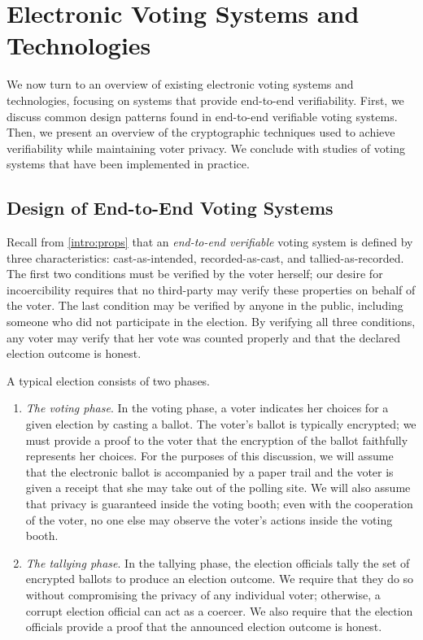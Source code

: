 \chapter{Electronic Voting Systems and Technologies} \label{evote}

We now turn to an overview of existing electronic voting systems and technologies, focusing on systems that provide end-to-end verifiability. First, we discuss common design patterns found in end-to-end verifiable voting systems. Then, we present an overview of the cryptographic techniques used to achieve verifiability while maintaining voter privacy. We conclude with studies of voting systems that have been implemented in practice.

\section{Design of End-to-End Voting Systems} \label{evote:design}

Recall from \ref{intro:props} that an \emph{end-to-end verifiable} voting system is defined by three characteristics: cast-as-intended, recorded-as-cast, and tallied-as-recorded. The first two conditions must be verified by the voter herself; our desire for incoercibility requires that no third-party may verify these properties on behalf of the voter. The last condition may be verified by anyone in the public, including someone who did not participate in the election. By verifying all three conditions, any voter may verify that her vote was counted properly and that the declared election outcome is honest.

A typical election consists of two phases.
\begin{enumerate}
\item \emph{The voting phase}. In the voting phase, a voter indicates her choices for a given election by casting a ballot. The voter's ballot is typically encrypted; we must provide a proof to the voter that the encryption of the ballot faithfully represents her choices. For the purposes of this discussion, we will assume that the electronic ballot is accompanied by a paper trail and the voter is given a receipt that she may take out of the polling site. We will also assume that privacy is guaranteed inside the voting booth; even with the cooperation of the voter, no one else may observe the voter's actions inside the voting booth.
\item \emph{The tallying phase}. In the tallying phase, the election officials tally the set of encrypted ballots to produce an election outcome. We require that they do so without compromising the privacy of any individual voter; otherwise, a corrupt election official can act as a coercer. We also require that the election officials provide a proof that the announced election outcome is honest.
\end{enumerate}

